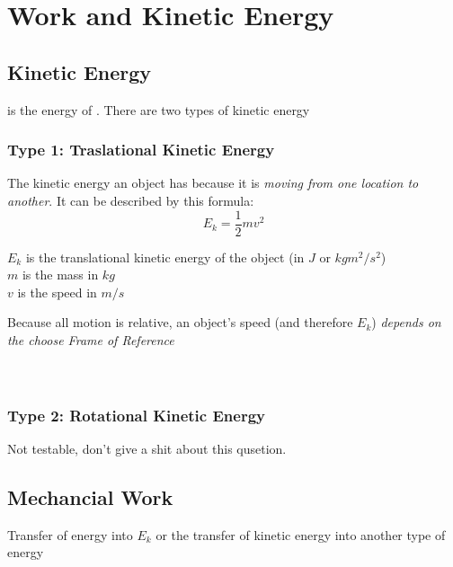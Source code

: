 \section{Work and Kinetic Energy}
\subsection{Kinetic Energy}
    \begin{definition}
         is the energy of . There are two types of kinetic energy
    \end{definition}

\subsubsection*{Type 1: Traslational Kinetic Energy}
The kinetic energy an object has because it is \textit{moving from one location to another}. It can be described by this 
formula:
\begin{equation}
    E_k = \frac{1}{2}mv^2
\end{equation}
\begin{center}
    $E_k$ is the translational kinetic energy of the object (in $J$ or $kgm^2/s^2$)\\
    $m$ is the mass in $kg$\\
    $v$ is the speed in $m/s$
\end{center}

Because all motion is relative, an object's speed (and therefore $E_k$) \textit{depends on the choose Frame of Reference}\\

\\

\\


\subsubsection*{Type 2: Rotational Kinetic Energy}
    Not testable, don't give a shit about this qusetion. 

\subsection{Mechancial Work}
    \begin{definition}
    Transfer of energy into $E_k$ or the transfer of kinetic energy into another type of energy
\end{definition}

